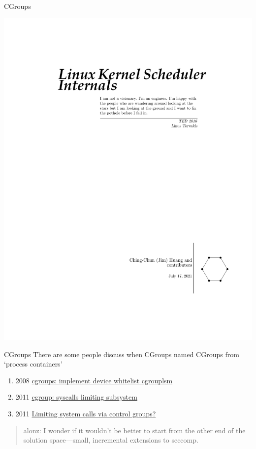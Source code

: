 \documentclass{beamer}
\begin{document}
\begin{CJK*}{UTF8}{bsmi}
\begin{frame}{CGroups}
\begin{multicols*}{2}
      \includegraphics[height=.8\textheight]{src/ksi_cover.pdf}
    \end{multicols*}
  \end{frame}

  \begin{frame}{CGroups}
    There are some people discuss when CGroups named CGroups from `process containers'
    \begin{enumerate}
      \item 2008 \href{http://lkml.iu.edu/hypermail/linux/kernel/0803.1/0671.html}{cgroups: implement device whitelist cgroup\+lsm}
      \item 2011 \href{https://lwn.net/Articles/463636/}{cgroup: syscalls limiting subsystem}
      \item 2011 \href{https://lwn.net/Articles/463683/}{Limiting system calls via control groups?}
    \end{enumerate}
    \begin{quote}{alonz: }
      I wonder if it wouldn't be better to start from the other end of the solution space—small, incremental extensions to seccomp.
    \end{quote}
  \end{frame}


\end{CJK*}
\end{document}
